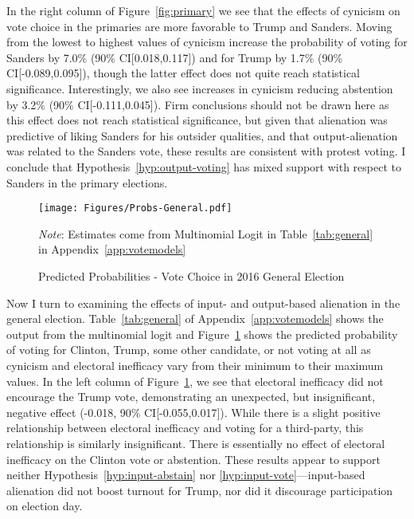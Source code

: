 \documentclass[12pt]{article}
\begin{document}
In the right column of Figure~\ref{fig:primary} we see that the effects of cynicism on vote choice in the primaries are more favorable to Trump and Sanders. Moving from the lowest to highest values of cynicism increase the probability of voting for Sanders by 7.0\% (90\% CI[0.018,0.117]) and for Trump by 1.7\% (90\% CI[-0.089,0.095]), though the latter effect does not quite reach statistical significance. Interestingly, we also see increases in cynicism reducing abstention by 3.2\% (90\% CI[-0.111,0.045]). Firm conclusions should not be drawn here as this effect does not reach statistical significance, but given that alienation was predictive of liking Sanders for his outsider qualities, and that output-alienation was related to the Sanders vote, these results are consistent with protest voting. I conclude that Hypothesis~\ref{hyp:output-voting} has mixed support with respect to Sanders in the primary elections. 

\begin{figure}[!ht]
	\centering
	\texttt{[image: Figures/Probs-General.pdf]}
	\caption{Predicted Probabilities - Vote Choice in 2016 General Election}\label{fig:general}
	\vspace{-8pt}
	{\scriptsize \textit{Note}: Estimates come from Multinomial Logit in Table~\ref{tab:general} in Appendix~\ref{app:votemodels} \par}
\end{figure}

Now I turn to examining the effects of input- and output-based alienation in the general election. Table~\ref{tab:general} of Appendix~\ref{app:votemodels} shows the output from the multinomial logit and Figure~\ref{fig:general} shows the predicted probability of voting for Clinton, Trump, some other candidate, or not voting at all as cynicism and electoral inefficacy vary from their minimum to their maximum values. In the left column of Figure~\ref{fig:general}, we see that electoral inefficacy did not encourage the Trump vote, demonstrating an unexpected, but insignificant, negative effect (-0.018, 90\% CI[-0.055,0.017]). While there is a slight positive relationship between electoral inefficacy and voting for a third-party, this relationship is similarly insignificant. There is essentially no effect of electoral inefficacy on the Clinton vote or abstention. These results appear to support neither Hypothesis~\ref{hyp:input-abstain} nor \ref{hyp:input-vote}---input-based alienation did not boost turnout for Trump, nor did it discourage participation on election day.
\end{document}
